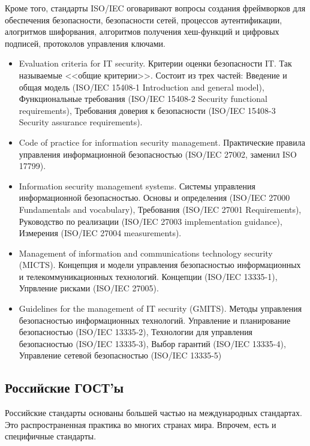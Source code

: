 Кроме того, стандарты ISO/IEC оговаривают вопросы создания фреймворков для обеспечения безопасности, безопасности сетей, процессов аутентификации, алогритмов шифорвания, алгоритмов получения хеш-функций и цифровых подписей, протоколов управления ключами.


\begin{itemize}
    \item Evaluation criteria for IT security. Критерии оценки безопасности IT. Так называемые <<общие критерии>>. Состоит из трех частей: Введение и общая модель (ISO/IEC 15408-1 Introduction and general model), Функциональные требования (ISO/IEC 15408-2 Security functional requirements), Требования доверия к безопасности (ISO/IEC 15408-3 Security assurance requirements).
    \item Code of practice for information security management. Практические правила управления информационной безопасностью (ISO/IEC 27002, заменил ISO 17799).
    \item Information security management systems. Системы управления информационной безопасностью. Основы и определения (ISO/IEC 27000 Fundamentals and vocabulary), Требования (ISO/IEC 27001 Requirements), Руководство по реализации (ISO/IEC 27003 implementation guidance), Измерения (ISO/IEC 27004 measurements).
    \item Management of information and communications technology security (MICTS). Концепция и модели управления безопасностью информационных и телекоммуникационных технологий. Концепции (ISO/IEC 13335-1), Упрвление рисками (ISO/IEC 27005).
    \item Guidelines for the management of IT security (GMITS). Методы управления безопасностью информационных технологий. Управление и планирование безопасностью (ISO/IEC 13335-2), Технологии для управления безопасностью (ISO/IEC 13335-3), Выбор гарантий (ISO/IEC 13335-4), Управление сетевой безопасностью (ISO/IEC 13335-5)
\end{itemize}


\subsection{Российские ГОСТ'ы}


Российские стандарты основаны большей частью на международных стандартах. Это распространенная практика во многих странах мира. Впрочем, есть и специфичные стандарты.


